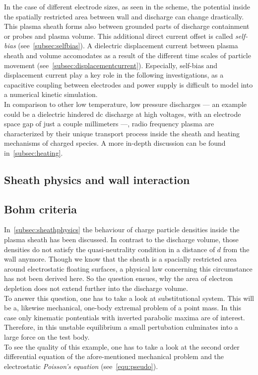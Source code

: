       In the case of different electrode sizes, as seen in the scheme, the potential inside the spatially restricted area between wall and discharge can change drastically. This plasma sheath forms also between grounded parts of discharge containment or probes and plasma volume. This additional direct current offset is called \emph{self-bias} (see~\autoref{subsec:selfbias}). A dielectric displacement current between plasma sheath and volume accomodates as a result of the different time scales of particle movement (see~\autoref{subsec:displacementcurrent}). Especially, self-bias and displacement current play a key role in the following investigations, as a capacitive coupling between electrodes and power supply is difficult to model into a numerical kinetic simulation.\\
		In comparison to other low temperature, low pressure discharges  --- an example could be a dielectric hindered dc discharge at high voltages, with an electrode space gap of just a couple millimeters ---, radio frequency plasma are characterized by their unique transport process inside the sheath and heating mechanisms of charged species. A more in-depth discussion can be found in~\autoref{subsec:heating}.\\ 

		\subsection{Sheath physics and wall interaction}\label{subsec:sheathphysics}

		\subsection{Bohm criteria}\label{subsec:bohmcriteria}

			In~\autoref{subsec:sheathphysics} the behaviour of charge particle densities inside the plasma sheath has been discussed. In contrast to the discharge volume, those densities do not satisfy the quasi-neutrality condition in a distance of $d$ from the wall anymore. Though we know that the sheath is a spacially restricted area around electrostatic floating surfaces, a physical law concerning this circumstance has not been derived here. So the question ensues, why the area of electron depletion does not extend further into the discharge volume.\\
		To answer this question, one has to take a look at substitutional system. This will be a, likewise mechanical, one-body extremal problem of a point mass. In this case only kinematic pontentials with inverted parabolic maxima are of interest. Therefore, in this unstable equilibrium a small pertubation culminates into a large force on the test body.\\
		To see the quality of this example, one has to take a look at the second order differential equation of the afore-mentioned mechanical problem and the electrostatic \emph{Poisson's equation} (see~\autoref{equ:pseudo}).

